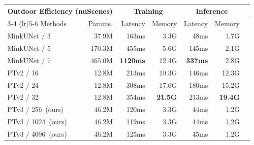 \begin{tabular}{l|rrrrrr}\toprule
\multicolumn{2}{l}{Outdoor Efficiency (nuScenes)} &\multicolumn{2}{c}{Training} &\multicolumn{2}{c}{Inference} \\ \cmidrule(lr){3-4} \cmidrule(lr){5-6}
Methods &Params. &Latency &Memory &Latency &Memory \\
\midrule
MinkUNet / 3~\cite{choy20194d} &37.9M &163ms &3.3G &48ms &1.7G \\
MinkUNet / 5~\cite{choy20194d} &170.3M &455ms &5.6G &145ms &2.1G \\
MinkUNet / 7~\cite{choy20194d} &465.0M &\textbf{1120ms} &12.4G &\textbf{337ms} &2.8G \\
\midrule
PTv2 / 16~\cite{wu2022point} &12.8M &213ms &10.3G &146ms &12.3G \\
PTv2 / 24~\cite{wu2022point} &12.8M &308ms &17.6G &180ms &15.2G \\
PTv2 / 32~\cite{wu2022point} &12.8M &354ms &\textbf{21.5G} &213ms &\textbf{19.4G} \\
\midrule
\cellcolor[HTML]{efefef}PTv3 / 256~(ours) &\cellcolor[HTML]{efefef}46.2M &\cellcolor[HTML]{efefef}120ms &\cellcolor[HTML]{efefef}3.3G &\cellcolor[HTML]{efefef}44ms &\cellcolor[HTML]{efefef}1.2G \\
\cellcolor[HTML]{efefef}PTv3 / 1024~(ours) &\cellcolor[HTML]{efefef}46.2M &\cellcolor[HTML]{efefef}119ms &\cellcolor[HTML]{efefef}3.3G &\cellcolor[HTML]{efefef}44ms &\cellcolor[HTML]{efefef}1.2G \\
\cellcolor[HTML]{efefef}PTv3 / 4096~(ours) &\cellcolor[HTML]{efefef}46.2M &\cellcolor[HTML]{efefef}125ms &\cellcolor[HTML]{efefef}3.3G &\cellcolor[HTML]{efefef}45ms &\cellcolor[HTML]{efefef}1.2G \\
\bottomrule
\end{tabular}